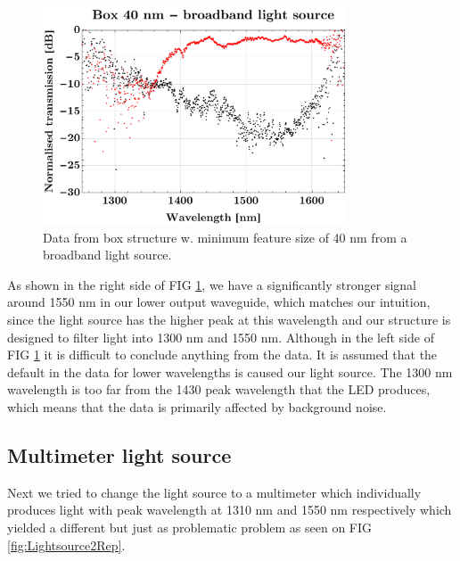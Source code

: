 \begin{figure}[H]
    \centering
    \includegraphics[width=0.8\textwidth]
        {fig/Kilde1Broadband/box40broadband.pdf}
    \caption{Data from box structure w. minimum feature size of 40 nm from a broadband light source.}
    \label{fig:Lightsource1Rep}
\end{figure}

As shown in the right side of FIG \ref{fig:Lightsource1Rep}, we have a significantly stronger signal around 1550 nm in our lower output waveguide, which matches our intuition, since the light source has the higher peak  at this wavelength and our structure is designed to filter light into 1300 nm and 1550 nm. Although in the left side of FIG \ref{fig:Lightsource1Rep} it is difficult to conclude anything from the data. It is assumed that the default in the data for lower wavelengths is caused our light source. The 1300 nm wavelength is too far from the 1430 peak wavelength that the LED produces, which means that the data is primarily affected by background noise. \\

\subsection{Multimeter light source}
Next we tried to change the light source to a multimeter which individually produces light with peak wavelength at 1310 nm and 1550 nm respectively which yielded a different but just as problematic problem as seen on FIG \ref{fig:Lightsource2Rep}. 

